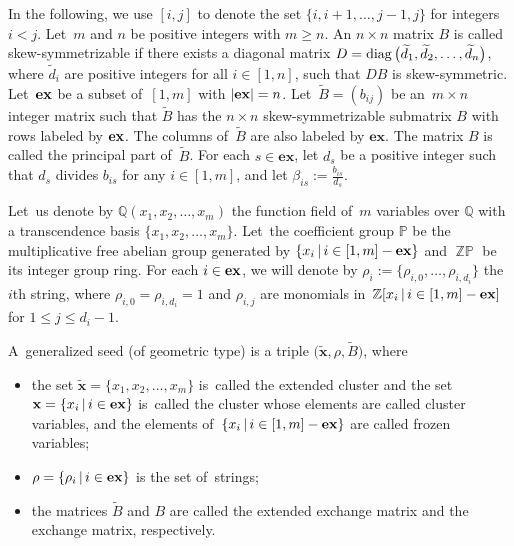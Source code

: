 \documentclass[10pt,a4paper]{amsart}
\numberwithin{equation}{section}
\begin{document}
In the following, we use $[i,j]$ to denote the set $\{i,i+1,\ldots,j-1,j\}$ for integers $i<j$. Let~$m$ and $n$ be positive integers with $m\geq n$.
An $n\times n$ matrix $B$ is called skew-symmetrizable
if there exists a diagonal matrix $D=\mathop{\rm diag}\big(\widetilde{d}_1,\widetilde{d}_2,\ldots,\widetilde{d}_n\big)$, where $\widetilde{d}_i$ are positive integers for all $i\in[1,n]$, such that $DB$ is skew-symmetric.
Let~${\rm\mathbf{ex}}$ be a subset of~$[1,m]$ with $|{\rm\mathbf{ex}}|=n$.
Let~$\widetilde{B}=(b_{ij})$ be an~$m\times n$ integer matrix such that $\widetilde{B}$ has the $n\times n$ skew-symmetrizable submatrix $B$ with rows labeled by ${\rm\mathbf{ex}}$.
The columns of~$\widetilde{B}$ are also labeled by $\mathbf{ex}$.
The matrix $B$ is called the principal part of~$\widetilde{B}$.
For each $s \in \mathbf{ex}$, let $d_s$ be a positive integer such that $d_s$ divides $b_{is}$ for any $i\in[1,m]$, and let $\beta_{is}:=\frac{b_{is}}{d_s}$.

Let~us denote by $\mathbb{Q}(x_{1},x_2,\ldots,x_{m})$ the function field of~$m$ variables over $\mathbb{Q}$ with a transcendence basis $\{x_1,x_2,\ldots,x_m\}$. Let~the coefficient group $\mathbb{P}$ be the multiplicative free abelian group generated by $\{x_{i}\,|\, i\in[1,m]-{\rm\mathbf{ex}} \}$ and $\mathop{\mathbb{ZP}}$ be its integer group ring.
For each $i\in{\rm\mathbf{ex}}$, we will denote by $\rho_i:=\{\rho_{i,0},\ldots,\rho_{i,d_i}\}$ the $i$th string, where $\rho_{i,0}=\rho_{i,d_i}=1$ and $\rho_{i,j}$ are monomials in~$\mathbb{Z} [x_{i}\,|\, i\in{[1,m]-\rm\mathbf{ex}}]$ for $1\leq j\leq d_i-1$.

\begin{Definition}\label{def of generalized seed}
A~generalized seed (of geometric type) is a triple $\big(\widetilde{\mathbf{x}},\rho,\widetilde{B}\big)$, where
\begin{itemize}\itemsep=0pt
 \item[(1)] the set $\widetilde{\mathbf{x}}=\{x_{1},x_2,\ldots,x_{m}\}$ is~called the extended cluster and the set $\mathbf{x}=\{x_{i}\,|\, i\in{\rm\mathbf{ex}}\}$ is~called the cluster
 whose elements are called cluster variables, and the elements of~$\{x_{i}\,|\, i\in[1,m]-{\rm\mathbf{ex}}\}$ are called frozen variables;
 \item[(2)] $\rho=\{\rho_{i}\,|\, i\in{\rm\mathbf{ex}}\}$ is the set of~strings;
 \item[(3)] the matrices $\widetilde{B}$ and $B$ are called the extended exchange matrix and the exchange matrix, respectively.
\end{itemize}
\end{Definition}
\end{document}
